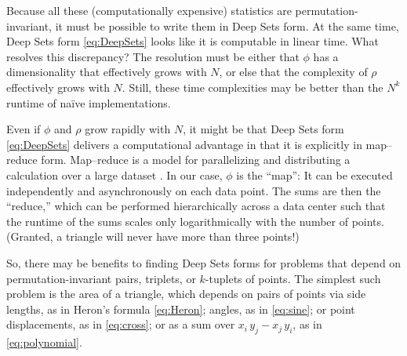 \documentclass[10pt]{article}
\begin{document}
Because all these (computationally expensive) statistics are permutation-invariant, it must be possible to write them in Deep Sets form.
At the same time, Deep Sets form \eqref{eq:DeepSets} looks like it is computable in linear time.
What resolves this discrepancy?
The resolution must be either that $\phi$ has a dimensionality that effectively grows with $N$, or else that the complexity of $\rho$ effectively grows with $N$.
Still, these time complexities may be better than the $N^k$ runtime of na\"ive implementations.

Even if $\phi$ and $\rho$ grow rapidly with $N$, it might be that Deep Sets form \eqref{eq:DeepSets} delivers a computational advantage in that it is explicitly in map--reduce form.
Map--reduce is a model for parallelizing and distributing a calculation over a large dataset \citep{DeanGhemawat2008,Lammel2008}.
In our case, $\phi$ is the ``map'':
It can be executed independently and asynchronously on each data point.
The sums are then the ``reduce,'' which can be performed hierarchically across a data center such that the runtime of the sums scales only logarithmically with the number of points.
(Granted, a triangle will never have more than three points!)

So, there may be benefits to finding Deep Sets forms for problems that depend on permutation-invariant pairs, triplets, or $k$-tuplets of points.
The simplest such problem is the area of a triangle, 
which depends on pairs of points via
side lengths, as in Heron's formula \eqref{eq:Heron};
angles, as in \eqref{eq:sine};
or point displacements, as in \eqref{eq:cross};
or as a sum over $x_i \, y_j - x_j \, y_i$, as in \eqref{eq:polynomial}.
\end{document}
